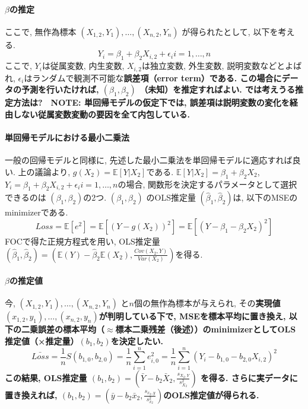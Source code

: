 \documentclass[paper=a4paper,fontsize=10pt]{jlreq}
\begin{document}
\paragraph{$\beta$の推定}
ここで, 無作為標本 $(X_{1,2}, Y_1), \dots, (X_{n,2}, Y_n)$ が得られたとして, 以下を考える.
\begin{equation*}
  Y_i = \beta_1+\beta_2X_{i,2}+\epsilon_i　i=1,\dots, n
\end{equation*}
ここで, $Y_i$は従属変数, 内生変数, $X_{i,2}$は独立変数, 外生変数, 説明変数などとよばれ, $\epsilon_i$はランダムで観測不可能な\rmfamily\mcfamily\bfseries{誤差項（error term）}\mdseries である. この場合にデータの予測を行いたければ, $(\beta_1, \beta_2)$ （未知）を推定すればよい. では考えうる推定方法は?　\rmfamily\mcfamily\bfseries{NOTE}\mdseries : 単回帰モデルの仮定下では, 誤差項は説明変数の変化を経由しない従属変数変動の要因を全て内包している.\\

\paragraph{単回帰モデルにおける最小二乗法}
一般の回帰モデルと同様に, 先述した最小二乗法を単回帰モデルに適応すれば良い. 上の議論より, $g(X_2)=\mathbb{E}[Y|X_{2}]$である. $\mathbb{E}[Y|X_{2}]=\beta_1+\beta_2X_{2}$, $Y_i = \beta_1+\beta_2X_{i,2}+\epsilon_i　i=1,\dots, n$の場合, 関数形を決定するパラメータとして選択できるのは $(\beta_1, \beta_2)$の2つ. $(\beta_1, \beta_2)$ のOLS推定量 $(\hat{\beta}_1, \hat{\beta}_2)$は, 以下のMSEのminimizerである.
\begin{equation*}
  Loss=\mathbb{E}[e^{2}]=\mathbb{E}[(Y-g(X_2))^{2}]=\mathbb{E}[(Y-\beta_1-\beta_2X_{2})^{2}]
\end{equation*}
FOCで得た正規方程式を用い, OLS推定量 $(\hat{\beta}_1, \hat{\beta}_2)=(\mathbb{E}(Y)-\hat{\beta}_2\mathbb{E}(X_2), \frac{Cov(X_2,Y)}{Var(X_2)})$を得る.\\

\paragraph{$\beta$の推定値}
今, $(X_{1,2}, Y_1), \dots, (X_{n,2}, Y_n)$ と$n$個の無作為標本が与えられ, その\rmfamily\mcfamily\bfseries{実現値}\mdseries $(x_{1,2}, y_1), \dots, (x_{n,2}, y_n)$が判明している下で, MSEを\rmfamily\mcfamily\bfseries{標本平均に置き換え}\mdseries , 以下の二乗誤差の標本平均（$\approx$標本二乗残差（後述））のminimizerとしてOLS推定値（×推定量）$(b_1, b_2)$を決定したい.
\begin{equation*}
  \bar{Loss}=\frac{1}{n}S(b_{1,0}, b_{2, 0})=\frac{1}{n}\sum_{i = 1}^{n} e_{i, 0}^{2}=\frac{1}{n}\sum_{i = 1}^{n} (Y_i-b_{1, 0}-b_{2, 0}X_{i, 2})^{2}
\end{equation*}
この結果, OLS推定量 $(b_1, b_2)=(\bar{Y}-b_2\bar{X}_2, \frac{s_{X_2,Y}}{s^{2}_{X_2}})$ を得る. さらに実データに置き換えれば, $(b_1, b_2)=(\bar{y}-b_2\bar{x}_2, \frac{s_{x_2,y}}{s^{2}_{x_2}})$のOLS推定値が得られる.\\
\end{document}
